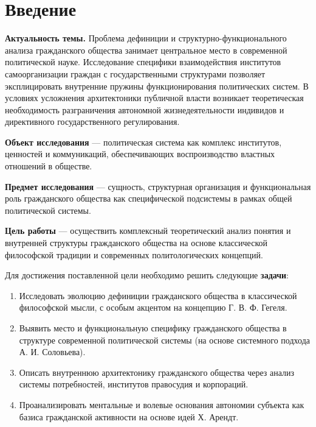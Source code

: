 \documentclass[a4paper, 14pt]{extarticle}
\begin{document}
\setcounter{page}{2}

\tableofcontents
\newpage

\section*{Введение}

\textbf{Актуальность темы.} Проблема дефиниции и структурно-функционального анализа гражданского общества занимает центральное место в современной политической науке. Исследование специфики взаимодействия институтов самоорганизации граждан с государственными структурами позволяет эксплицировать внутренние пружины функционирования политических систем. В условиях усложнения архитектоники публичной власти возникает теоретическая необходимость разграничения автономной жизнедеятельности индивидов и директивного государственного регулирования.

\textbf{Объект исследования} --- политическая система как комплекс институтов, ценностей и коммуникаций, обеспечивающих воспроизводство властных отношений в обществе.

\textbf{Предмет исследования} --- сущность, структурная организация и функциональная роль гражданского общества как специфической подсистемы в рамках общей политической системы.

\textbf{Цель работы} --- осуществить комплексный теоретический анализ понятия и внутренней структуры гражданского общества на основе классической философской традиции и современных политологических концепций.

Для достижения поставленной цели необходимо решить следующие \textbf{задачи}:
\begin{enumerate}
    \item Исследовать эволюцию дефиниции гражданского общества в классической философской мысли, с особым акцентом на концепцию Г. В. Ф. Гегеля.
    \item Выявить место и функциональную специфику гражданского общества в структуре современной политической системы (на основе системного подхода А. И. Соловьева).
    \item Описать внутреннюю архитектонику гражданского общества через анализ системы потребностей, институтов правосудия и корпораций.
    \item Проанализировать ментальные и волевые основания автономии субъекта как базиса гражданской активности на основе идей Х. Арендт.
\end{enumerate}
\end{document}
